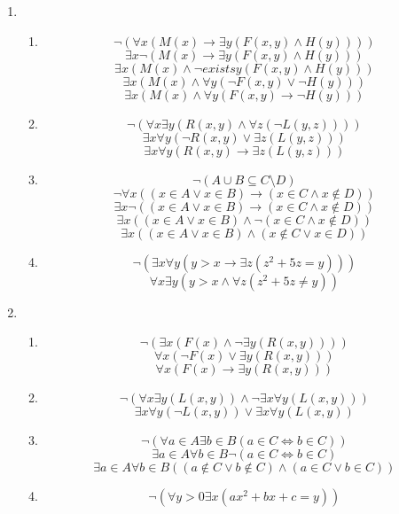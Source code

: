 \begin{enumerate}
    \item
    \begin{enumerate}
        \item 
        \[\lnot (\forall x (M(x) \rightarrow \exists y (F(x,y) \land H(y))))\]
        \[\exists x \lnot (M(x) \rightarrow \exists y (F(x,y) \land H(y)))\]
        \[\exists x (M(x) \land \lnot exists y (F(x,y) \land H(y)))\]
        \[\exists x (M(x) \land \forall y (\lnot F(x,y) \lor \lnot H(y)))\]
        \[\exists x (M(x) \land \forall y (F(x,y) \rightarrow \lnot H(y)))\]
        \item 
        \[\lnot(\forall x \exists y(R(x,y) \land \forall z (\lnot L(y,z))))\]
        \[\exists x \forall y (\lnot R(x,y) \lor \exists z (L(y,z)))\]
        \[\exists x \forall y (R(x,y) \rightarrow \exists z (L(y,z)))\]
        \item 
        \[\lnot (A \cup B \subseteq C \setminus D)\]
        \[\lnot \forall x ((x \in A \lor x \in B) \rightarrow (x \in C \land x \notin D))\]
        \[\exists x \lnot ((x \in A \lor x \in B) \rightarrow (x \in C \land x \notin D))\]
        \[\exists x ((x \in A \lor x \in B) \land \lnot (x \in C \land x \notin D))\]
        \[\exists x ((x \in A \lor x \in B) \land (x \notin C \lor x \in D))\]
        \item 
        \[\lnot (\exists x \forall y (y > x \rightarrow \exists z (z^2 +5z = y)))\]
        \[\forall x \exists y (y > x \land \forall z (z^2 +5z \neq y))\]
    \end{enumerate}
    \item
    \begin{enumerate}
        \item 
        \[\lnot (\exists x (F(x) \land \lnot \exists y (R(x, y))))\]
        \[\forall x (\lnot F(x) \lor \exists y (R(x,y)))\]
        \[\forall x (F(x) \rightarrow \exists y (R(x,y)))\]
        \item 
        \[\lnot (\forall x \exists y (L(x,y)) \land \lnot \exists x \forall y (L(x,y)))\]
        \[\exists x \forall y (\lnot L(x,y)) \lor \exists x \forall y (L(x,y))\]
        \item 
        \[\lnot (\forall a \in A \exists b \in B (a \in C \iff b \in C))\]
        \[\exists a \in A \forall b \in B \lnot(a \in C \iff b \in C)\]
        \[\exists a \in A \forall b \in B ((a \notin C \lor b \notin C) \land (a \in C \lor b \in C)) \]
        \item 
        \[\lnot(\forall y > 0 \exists x (ax^2 +bx +c = y))\]

\end{enumerate}
\end{enumerate}
